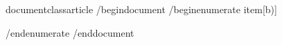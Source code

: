 documentclass{article}
/begin{document}
    /begin{enumerate}
        item[b)]
            
    /end{enumerate}
/end{document}       